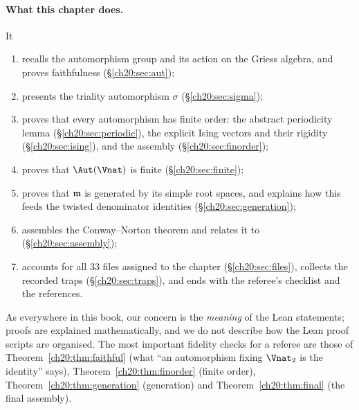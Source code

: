 \paragraph{What this chapter does.}  It
\begin{enumerate}[label=(\arabic*)]
\item recalls the automorphism group  and its action on the Griess algebra, and proves faithfulness
  (\S\ref{ch20:sec:aut});
\item presents the triality automorphism $\sigma$ (\S\ref{ch20:sec:sigma});
\item proves that every automorphism has finite order: the abstract periodicity lemma
  (\S\ref{ch20:sec:periodic}), the explicit Ising vectors and their rigidity (\S\ref{ch20:sec:ising}), and the
  assembly (\S\ref{ch20:sec:finorder});
\item proves that $\Aut(\Vnat)$ is finite (\S\ref{ch20:sec:finite});
\item proves that $\mathfrak m$ is generated by its simple root spaces, and explains how this feeds the twisted
  denominator identities (\S\ref{ch20:sec:generation});
\item assembles the Conway--Norton theorem and relates it to  (\S\ref{ch20:sec:assembly});
\item accounts for all $33$ files assigned to the chapter (\S\ref{ch20:sec:files}), collects the recorded traps
  (\S\ref{ch20:sec:traps}), and ends with the referee's checklist and the references.
\end{enumerate}
As everywhere in this book, our concern is the \emph{meaning} of the Lean statements; proofs are explained
mathematically, and we do not describe how the Lean proof scripts are organised.  The most important fidelity checks
for a referee are those of Theorem~\ref{ch20:thm:faithful} (what ``an automorphism fixing $\Vnat_2$ is the
identity'' says), Theorem~\ref{ch20:thm:finorder} (finite order), Theorem~\ref{ch20:thm:generation} (generation)
and Theorem~\ref{ch20:thm:final} (the final assembly).

